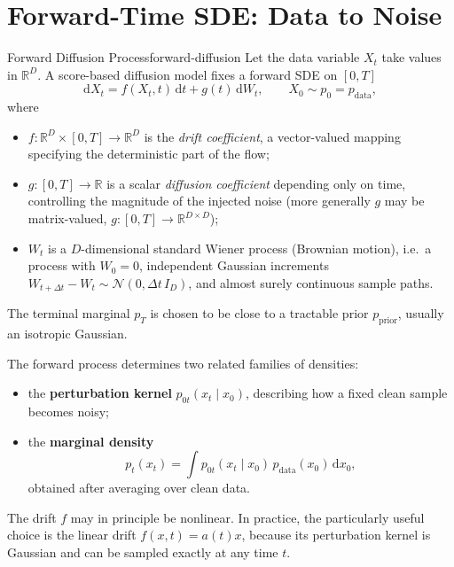 \documentclass[11pt,a4paper]{article}
\renewcommand{\d}{\mathrm{d}}
\newcommand{\R}{\mathbb{R}}
\newcommand{\cN}{\mathcal{N}}
\newcommand{\pdata}{p_{\mathrm{data}}}
\newcommand{\pprior}{p_{\mathrm{prior}}}
\begin{document}
\section{Forward-Time SDE: Data to Noise}\label{sec:forward}

\begin{definition}{Forward Diffusion Process}{forward-diffusion}
Let the data variable $X_t$ take values in $\R^D$.  A score-based diffusion
model fixes a forward SDE on $[0,T]$
\[
  \d X_t=f(X_t,t)\,\d t+g(t)\,\d W_t,
  \qquad X_0\sim p_0=\pdata,
\]
where
\begin{itemize}[nosep]
  \item $f:\R^D\times[0,T]\to\R^D$ is the \emph{drift coefficient}, a
        vector-valued mapping specifying the deterministic part of the flow;
  \item $g:[0,T]\to\R$ is a scalar \emph{diffusion coefficient} depending only
        on time, controlling the magnitude of the injected noise (more generally
        $g$ may be matrix-valued, $g:[0,T]\to\R^{D\times D}$);
  \item $W_t$ is a $D$-dimensional standard Wiener process (Brownian motion),
        i.e.\ a process with $W_0=0$, independent Gaussian increments
        $W_{t+\Delta t}-W_t\sim\cN(0,\Delta t\,I_D)$, and almost surely
        continuous sample paths.
\end{itemize}
The terminal marginal $p_T$ is chosen to be close to a tractable prior
$\pprior$, usually an isotropic Gaussian.
\end{definition}

The forward process determines two related families of densities:
\begin{itemize}
  \item the \textbf{perturbation kernel} $p_{0t}(x_t\mid x_0)$, describing
        how a fixed clean sample becomes noisy;
  \item the \textbf{marginal density}
        \begin{equation}\label{eq:marginal-mixture}
          p_t(x_t)=\int p_{0t}(x_t\mid x_0)\,\pdata(x_0)\,\d x_0,
        \end{equation}
        obtained after averaging over clean data.
\end{itemize}

The drift $f$ may in principle be nonlinear.  In practice, the particularly
useful choice is the linear drift $f(x,t)=a(t)x$, because its perturbation
kernel is Gaussian and can be sampled exactly at any time $t$.
\end{document}

